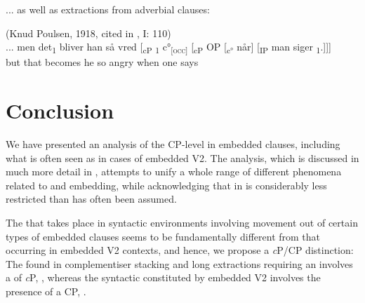 \documentclass[output=paper]{LSP/langsci}
\begin{document}
... as well as extractions from adverbial clauses:

\noindent\parbox{\textwidth}{\ea%
    \label{ex:vikner:20}
 (Knud Poulsen, 1918, cited in \citealt{Hansen1967}, I: 110)\\
    \gll {  }  { ... }  { men }  { det\textsubscript{1} }  { bliver }  { han }  { så }  { vred }  { [{\textsubscript{c}}\textsubscript{P} {\longrule}\textsubscript{1}  {c°}\textsubscript{[}\textsc{\textsubscript{occ}}\textsubscript{]} }  { [{\textsubscript{c}}\textsubscript{P } }  { OP }  { [{\textsubscript{c°}} }  { når] }  { [\textsubscript{IP} }  { man }  { siger }  { {\longrule}\textsubscript{1}.]]]}\\
	 {  }  {  }  { {but} }  { {that} }  { {becomes} }  { {he} }  { {so} }  { {angry} }  {  }  {  }  {  }  {  }  { {when} }  {  }  { {one} }  { {says} }  { }\\
    \glt
    \z
}

\section{Conclusion}

We have presented an analysis of the CP-level in embedded clauses, including what is often seen as  in cases of embedded V2. The analysis, which is discussed in much more detail in \citet{NyvadEtAl2016}, attempts to unify a whole range of different phenomena related to  and embedding, while acknowledging that  in  is considerably less restricted than has often been assumed.

The  that takes place in syntactic environments involving movement out of certain types of embedded clauses seems to be fundamentally different from that occurring in embedded V2 contexts, and hence, we propose a \textit{c}P/CP distinction: The  found in complementiser stacking and long extractions requiring an  involves a  of \textit{c}P, , whereas the syntactic  constituted by embedded V2 involves the presence of a CP, . 
\end{document}
